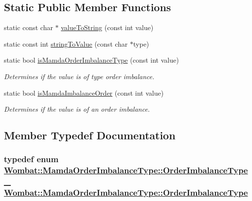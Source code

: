 \subsection*{Static Public Member Functions}
\begin{CompactItemize}
\item 
static const char $\ast$ \hyperlink{classWombat_1_1MamdaOrderImbalanceType_472a23cf11563b1ae4c675798d0b194e}{value\-To\-String} (const int value)
\item 
static const int \hyperlink{classWombat_1_1MamdaOrderImbalanceType_663f7a8d8da8fda23d711502b2da1762}{string\-To\-Value} (const char $\ast$type)
\item 
static bool \hyperlink{classWombat_1_1MamdaOrderImbalanceType_424a164dcbeff0839f0a0349171e0a51}{is\-Mamda\-Order\-Imbalance\-Type} (const int value)
\begin{CompactList}\small\item\em Determines if the value is of type order imbalance. \item\end{CompactList}\item 
static bool \hyperlink{classWombat_1_1MamdaOrderImbalanceType_ead12fbb3cb238a2e77cb7431109f42d}{is\-Mamda\-Imbalance\-Order} (const int value)
\begin{CompactList}\small\item\em Determines if the value is of an order imbalance. \item\end{CompactList}\end{CompactItemize}


\subsection{Member Typedef Documentation}
\hypertarget{classWombat_1_1MamdaOrderImbalanceType_370ce0bab0cc5de6c2452408a1abb6d1}{
\subsubsection[OrderImbalanceType]{\setlength{\rightskip}{0pt plus 5cm}typedef enum \hyperlink{classWombat_1_1MamdaOrderImbalanceType_1d6586915356b2aa4c6931591f172c14}{Wombat::Mamda\-Order\-Imbalance\-Type::Order\-Imbalance\-Type\_\-}  \hyperlink{classWombat_1_1MamdaOrderImbalanceType_370ce0bab0cc5de6c2452408a1abb6d1}{Wombat::Mamda\-Order\-Imbalance\-Type::Order\-Imbalance\-Type}}}
\label{classWombat_1_1MamdaOrderImbalanceType_370ce0bab0cc5de6c2452408a1abb6d1}




